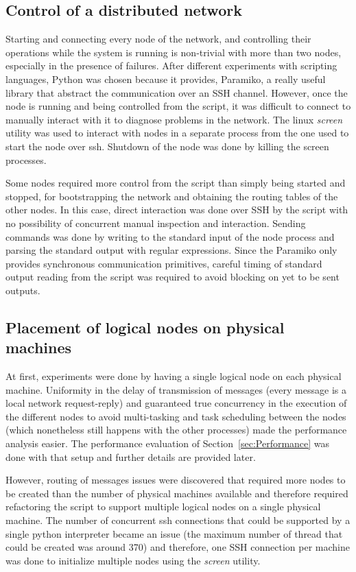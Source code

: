 \subsection{Control of a distributed network}

Starting and connecting every node of the network, and controlling their operations while the system is running is non-trivial with more than two nodes, especially in the presence of failures. After different experiments with scripting languages, Python was chosen because it provides, Paramiko, a really useful library that abstract the communication over an SSH channel. However, once the node is running and being controlled from the script, it was difficult to connect to manually interact with it to diagnose problems in the network.  The linux \textit{screen} utility was used to interact with nodes in a separate process from the one used to start the node over ssh. Shutdown of the node was done by killing the screen processes. 

Some nodes required more control from the script than simply being started and stopped, for bootstrapping the network and obtaining the routing tables of the other nodes. In this case, direct interaction was done over SSH by the script with no possibility of concurrent manual inspection and interaction. Sending commands was done by writing to the standard input of the node process and parsing the standard output with regular expressions. Since the Paramiko only provides synchronous communication primitives, careful timing of standard output reading from the script was required to avoid blocking on yet to be sent outputs.

\subsection{Placement of logical nodes on physical machines}

At first, experiments were done by having a single logical node on each physical machine. Uniformity in the delay of transmission of messages (every message is a local network request-reply) and guaranteed true concurrency in the execution of the different nodes to avoid multi-tasking and task scheduling between the nodes (which nonetheless still happens with the other processes) made the performance analysis easier. The performance evaluation of Section~\ref{sec:Performance} was done with that setup and further details are provided later.

However, routing of messages issues were discovered that required more nodes to be created than the number of physical machines available and therefore required refactoring the script to support multiple logical nodes on a single physical machine. The number of concurrent ssh connections that could be supported by a single python interpreter became an issue (the maximum number of thread that could be created was around 370) and therefore, one SSH connection per machine was done to initialize multiple nodes using the \textit{screen} utility.

